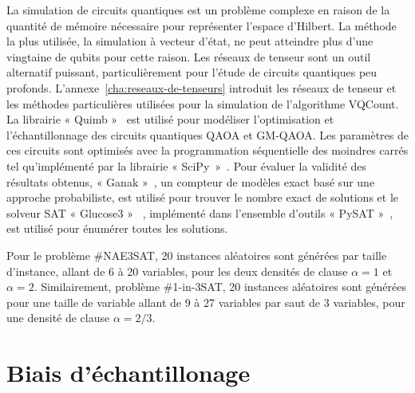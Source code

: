 La simulation de circuits quantiques est un problème complexe en raison de la quantité de mémoire nécessaire pour représenter l'espace d'Hilbert. La méthode la plus utilisée, la simulation à vecteur d'état, ne peut atteindre plus d'une vingtaine de qubits pour cette raison. Les réseaux de tenseur sont un outil alternatif puissant, particulièrement pour l'étude de circuits quantiques peu profonds. L'annexe~\ref{cha:reseaux-de-tenseurs} introduit les réseaux de tenseur et les méthodes particulières utilisées pour la simulation de l'algorithme VQCount. La librairie « Quimb »~\cite{grayQuimbPythonPackage2018} est utilisé pour modéliser l'optimisation et l'échantillonnage des circuits quantiques QAOA et GM-QAOA. Les paramètres de ces circuits sont optimisés avec la programmation séquentielle des moindres carrés tel qu'implémenté par la librairie « SciPy »~\cite{virtanenSciPy10Fundamental2020}. Pour évaluer la validité des résultats obtenus, « Ganak »~\cite{sharmaGANAKScalableProbabilistic2019}, un compteur de modèles exact basé sur une approche probabiliste, est utilisé pour trouver le nombre exact de solutions et le solveur SAT « Glucose3 »~\cite{eenExtensibleSATsolver2004,audemardPredictingLearntClauses2009} , implémenté dans l'ensemble d'outils « PySAT »~\cite{ignatievPySATPythonToolkit2018}, est utilisé pour énumérer toutes les solutions.

Pour le problème \#NAE3SAT, 20 instances aléatoires sont générées par taille d'instance, allant de 6 à 20 variables, pour les deux densités de clause $\alpha=1$ et $\alpha = 2$. Similairement, problème \#1-in-3SAT, 20 instances aléatoires sont générées pour une taille de variable allant de 9 à 27 variables par saut de 3 variables, pour une densité de clause $\alpha = 2/3$. 



\section{Biais d'échantillonage}


